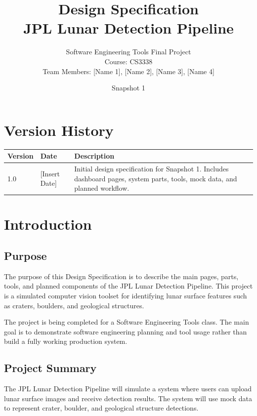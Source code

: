 \documentclass[12pt]{article}
\title{
    \textbf{Design Specification} \\
    JPL Lunar Detection Pipeline
}
\author{
    Software Engineering Tools Final Project \\
    Course: CS3338 \\
    Team Members: [Name 1], [Name 2], [Name 3], [Name 4]
}
\date{Snapshot 1}
\begin{document}
\maketitle
\newpage

\tableofcontents
\newpage

\section*{Version History}

\begin{longtable}{|p{1.5in}|p{1.5in}|p{3in}|}
\hline
\textbf{Version} & \textbf{Date} & \textbf{Description} \\
\hline
1.0 & [Insert Date] & Initial design specification for Snapshot 1. Includes dashboard pages, system parts, tools, mock data, and planned workflow. \\
\hline
\end{longtable}

\newpage

\section{Introduction}

\subsection{Purpose}

The purpose of this Design Specification is to describe the main pages, parts, tools, and planned components of the JPL Lunar Detection Pipeline. This project is a simulated computer vision toolset for identifying lunar surface features such as craters, boulders, and geological structures.

The project is being completed for a Software Engineering Tools class. The main goal is to demonstrate software engineering planning and tool usage rather than build a fully working production system.

\subsection{Project Summary}

The JPL Lunar Detection Pipeline will simulate a system where users can upload lunar surface images and receive detection results. The system will use mock data to represent crater, boulder, and geological structure detections.
\end{document}
